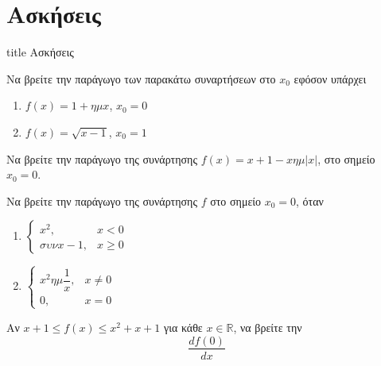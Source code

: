 \documentclass{presentation}
\begin{document}
\section{Ασκήσεις}

\begin{frame}[noframenumbering]
  \vfill
  \centering
  \begin{beamercolorbox}[sep=8pt,center,shadow=true,rounded=true]{title}
    Ασκήσεις
  \end{beamercolorbox}
  \vfill
\end{frame}

\begin{askisi}
  Να βρείτε την παράγωγο των παρακάτω συναρτήσεων στο $x_0$ εφόσον υπάρχει
  \begin{enumerate}
    \item<1-> $f(x)=1+ημx$, $x_0=0$
    \item<2-> $f(x)=\sqrt{x-1}$, $x_0=1$
  \end{enumerate}

\end{askisi}

\begin{askisi}
  Να βρείτε την παράγωγο της συνάρτησης $f(x)=x+1-xημ|x|$, στο σημείο $x_0=0$.

\end{askisi}

\begin{askisi}
  Να βρείτε την παράγωγο της συνάρτησης $f$ στο σημείο $x_0=0$, όταν
  \begin{enumerate}
    \item<1-> $\begin{cases}
              x^2,    & x<0    \\
              συνx-1, & x\ge 0
            \end{cases}$
    \item<2-> $\begin{cases}
              x^2ημ\dfrac{1}{x}, & x\ne 0 \\
              0,                 & x= 0
            \end{cases}$
  \end{enumerate}

\end{askisi}

\begin{askisi}
  Αν $x+1\le f(x) \le x^2+x+1$ για κάθε $x\in\mathbb{R}$, να βρείτε την
  $$\frac{df(0)}{dx}$$

\end{askisi}
\end{document}
